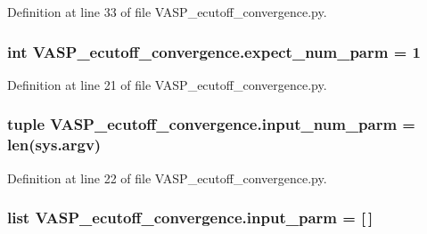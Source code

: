 Definition at line 33 of file V\+A\+S\+P\+\_\+ecutoff\+\_\+convergence.\+py.

\hypertarget{namespace_v_a_s_p__ecutoff__convergence_a9965ad85793a2cde84cd51cabb5d5a35}{
\subsubsection[{expect\+\_\+num\+\_\+parm}]{\setlength{\rightskip}{0pt plus 5cm}int V\+A\+S\+P\+\_\+ecutoff\+\_\+convergence.\+expect\+\_\+num\+\_\+parm = 1}}\label{namespace_v_a_s_p__ecutoff__convergence_a9965ad85793a2cde84cd51cabb5d5a35}


Definition at line 21 of file V\+A\+S\+P\+\_\+ecutoff\+\_\+convergence.\+py.

\hypertarget{namespace_v_a_s_p__ecutoff__convergence_a5370b53a459335c6ec045ad0bb6bd759}{
\subsubsection[{input\+\_\+num\+\_\+parm}]{\setlength{\rightskip}{0pt plus 5cm}tuple V\+A\+S\+P\+\_\+ecutoff\+\_\+convergence.\+input\+\_\+num\+\_\+parm = len(sys.\+argv)}}\label{namespace_v_a_s_p__ecutoff__convergence_a5370b53a459335c6ec045ad0bb6bd759}


Definition at line 22 of file V\+A\+S\+P\+\_\+ecutoff\+\_\+convergence.\+py.

\hypertarget{namespace_v_a_s_p__ecutoff__convergence_a160a76862b3ae963040ff4c3d81d4f19}{
\subsubsection[{input\+\_\+parm}]{\setlength{\rightskip}{0pt plus 5cm}list V\+A\+S\+P\+\_\+ecutoff\+\_\+convergence.\+input\+\_\+parm = \mbox{[}$\,$\mbox{]}}}\label{namespace_v_a_s_p__ecutoff__convergence_a160a76862b3ae963040ff4c3d81d4f19}


